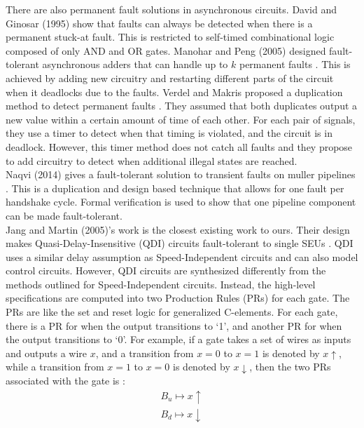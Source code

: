 \documentclass[12pt]{report}
\begin{document}
There are also permanent fault solutions in asynchronous circuits.  
David and Ginosar (1995) show that faults can always be detected when there is a permanent stuck-at fault.  This is restricted to self-timed combinational logic composed of only AND and OR gates.  
Manohar and Peng (2005) designed fault-tolerant asynchronous adders that can handle up to $k$ permanent faults \cite{PengManohar_asyncadder}.  This is achieved by adding new circuitry and restarting different parts of the circuit when it deadlocks due to the faults.  Verdel and Makris proposed a duplication method to detect permanent faults \cite{async_dup_ced}.  They assumed that both duplicates output a new value within a certain amount of time of each other.  For each pair of signals, they use a timer to detect when that timing is violated, and the circuit is in deadlock.  However, this timer method does not catch all faults and they propose to add circuitry to detect when additional illegal states are reached.    
\\

Naqvi (2014) gives a fault-tolerant solution to transient faults on muller pipelines \cite{Naqvi_mullerpipeline}.  This is a duplication and design based technique that allows for one fault per handshake cycle.  Formal verification is used to show that one pipeline component can be made fault-tolerant. \\


Jang and Martin (2005)’s work is the closest existing work to ours. Their design makes Quasi-Delay-Insensitive (QDI) circuits fault-tolerant to single SEUs \cite{JangMartin_SEUQDI}. QDI uses a similar delay assumption as Speed-Independent circuits and can also model control circuits. However, QDI circuits are synthesized differently from the methods outlined for Speed-Independent circuits. Instead, the high-level specifications are computed into two Production Rules (PRs) for each gate. The PRs are like the set and reset logic for generalized C-elements. For each gate, there is a PR for when the output transitions to `1', and another PR for when the output transitions to `0'. For example, if a gate takes a set of wires as inputs and outputs a wire $x$, and a transition from $x=0$ to $x=1$ is denoted by $x\uparrow$, while a transition from $x=1$ to $x=0$ is denoted by $x\downarrow$, then the two PRs associated with the gate is :
\begin{align*}
B_u\mapsto x\uparrow \\
B_d\mapsto x\downarrow 
\end{align*}
\end{document}
